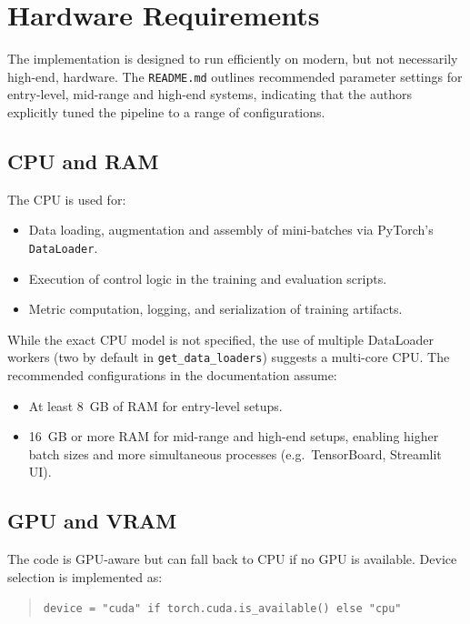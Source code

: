 \section{Hardware Requirements}
\label{sec:hardware}

The implementation is designed to run efficiently on modern, but not necessarily high-end, hardware. The \texttt{README.md} outlines recommended parameter settings for entry-level, mid-range and high-end systems, indicating that the authors explicitly tuned the pipeline to a range of configurations.

\subsection{CPU and RAM}

The CPU is used for:
\begin{itemize}
  \item Data loading, augmentation and assembly of mini-batches via PyTorch's \texttt{DataLoader}.
  \item Execution of control logic in the training and evaluation scripts.
  \item Metric computation, logging, and serialization of training artifacts.
\end{itemize}

While the exact CPU model is not specified, the use of multiple DataLoader workers (two by default in \texttt{get\_data\_loaders}) suggests a multi-core CPU. The recommended configurations in the documentation assume:
\begin{itemize}
  \item At least 8~GB of RAM for entry-level setups.
  \item 16~GB or more RAM for mid-range and high-end setups, enabling higher batch sizes and more simultaneous processes (e.g.\ TensorBoard, Streamlit UI).
\end{itemize}

\subsection{GPU and VRAM}

The code is GPU-aware but can fall back to CPU if no GPU is available. Device selection is implemented as:
\begin{quote}
  \texttt{device = "cuda" if torch.cuda.is\_available() else "cpu"}
\end{quote}

